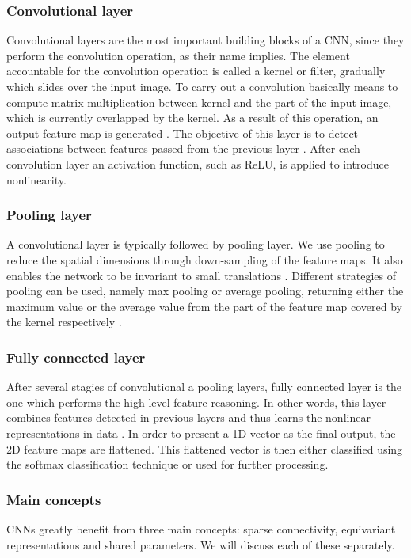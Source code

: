 \subsubsection*{Convolutional layer}
Convolutional layers are the most important building blocks of a CNN, since they perform the convolution operation, as their name implies. The element accountable for the convolution operation is called a kernel or filter, gradually which slides over the input image. To carry out a convolution basically means to compute matrix multiplication between kernel and the part of the input image, which is currently overlapped by the kernel. As a result of this operation, an output feature map is generated \cite{greekDeepLearning}. The objective of this layer is to detect associations between features passed from the previous layer \cite{lecundeeplearning}. After each convolution layer an activation function, such as ReLU, is applied to introduce nonlinearity.

\subsubsection*{Pooling layer}
A convolutional layer is typically followed by pooling layer. We use pooling to reduce the spatial dimensions through down-sampling of the feature maps. It also enables the network to be invariant to small translations \cite{deeplearningbook}. Different strategies of pooling can be used, namely max pooling or average pooling, returning either the maximum value or the average value from the part of the feature map covered by the kernel respectively \cite{lecundeeplearning}.
\subsubsection*{Fully connected layer}
After several stagies of convolutional a pooling layers, fully connected layer is the one which performs the high-level feature reasoning. In other words, this layer combines features detected in previous layers and thus learns the nonlinear representations in data \cite{greekDeepLearning}. In order to present a 1D vector as the final output, the 2D feature maps are flattened. This flattened vector is then either classified using the softmax classification technique or used for further processing.
\subsubsection{Main concepts}
CNNs greatly benefit from three main concepts: sparse connectivity, equivariant representations and shared parameters. We will discuss each of these separately.
